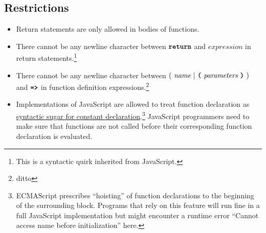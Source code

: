 \subsection*{Restrictions}

\begin{itemize}
\item Return statements are only allowed in bodies of functions.
\item There cannot be any newline character between
  $\textbf{\texttt{return}}$ and $\textit{expression}$ in return statements.\footnote{
  This is a syntactic quirk inherited from JavaScript.}
\item There cannot be any newline character between
  $(\ \textit{name}\ | \ \textbf{\texttt{(}}\ \textit{parameters}\ \textbf{\texttt{)}}\ )$
  and
  $\texttt{\textbf{=>}}$ in function definition expressions.\footnote{ditto}
\item Implementations of JavaScript are allowed to treat function
  declaration as \href{https://sourceacademy.org/sicpjs/1.3.2\#footnote-2}{
    syntactic sugar for constant declaration}.\footnote{ECMAScript prescribes ``hoisting''
    of function declarations to the beginning of the surrounding block. Programs that rely
    on this feature will run fine in a full JavaScript implementation but might encounter a
    runtime error ``Cannot access name before initialization'' here.}
  JavaScript programmers need
  to make sure that functions are not called before their corresponding function declaration
  is evaluated.

\end{itemize}
